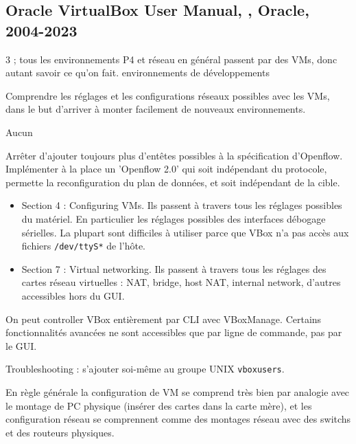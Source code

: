 
\subsection{Oracle VirtualBox User Manual, \cite{noauthor_oracle_2004}, Oracle, 2004-2023}
 3 ; tous les environnements P4 et réseau en général passent par des VMs, donc autant savoir ce qu’on fait.
 environnements de développements

 Comprendre les réglages et les configurations réseaux possibles avec les VMs, dans le but d'arriver à monter facilement de nouveaux environnements.

 Aucun


 Arrêter d'ajouter toujours plus d'entêtes possibles à la spécification d'Openflow. Implémenter à la place un 'Openflow 2.0' qui soit indépendant du protocole, permette la reconfiguration du plan de données, et soit indépendant de la cible.


\begin{itemize}
	\item Section 4 : Configuring VMs. Ils passent à travers tous les réglages possibles du matériel. En particulier les réglages possibles des interfaces débogage sérielles. La plupart sont difficiles à utiliser parce que VBox n’a pas accès aux fichiers \texttt{/dev/ttyS*} de l’hôte.
	\item Section 7 : Virtual networking. Ils passent à travers tous les réglages des cartes réseau virtuelles : NAT, bridge, host NAT, internal network, d’autres accessibles hors du GUI.
\end{itemize}

On peut controller VBox entièrement par CLI avec VBoxManage. Certains fonctionnalités avancées ne sont accessibles que par ligne de commande, pas par le GUI.

Troubleshooting : s’ajouter soi-même au groupe UNIX \texttt{vboxusers}.

 En règle générale la configuration de VM se comprend très bien par analogie avec le montage de PC physique (insérer des cartes dans la carte mère), et les configuration réseau se comprennent comme des montages réseau avec des switchs et des routeurs physiques.

\clearpage
